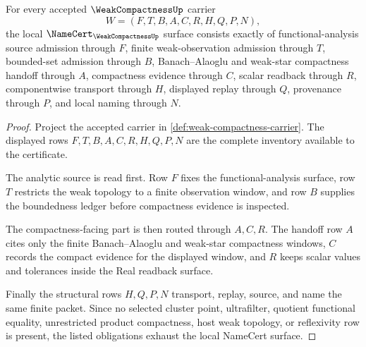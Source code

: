 \begin{theorem}
\label{thm:weak-compactness-namecert-obligations}
For every accepted $\WeakCompactnessUp$ carrier
$$
W=(F,T,B,A,C,R,H,Q,P,N),
$$
the local $\NameCert_{\WeakCompactnessUp}$ surface consists exactly of functional-analysis source admission through $F$, finite weak-observation admission through $T$, bounded-set admission through $B$, Banach--Alaoglu and weak-star compactness handoff through $A$, compactness evidence through $C$, scalar readback through $R$, componentwise transport through $H$, displayed replay through $Q$, provenance through $P$, and local naming through $N$.
\end{theorem}
\begin{proof}
Project the accepted carrier in \autoref{def:weak-compactness-carrier}. The displayed rows $F,T,B,A,C,R,H,Q,P,N$ are the complete inventory available to the certificate.

The analytic source is read first. Row $F$ fixes the functional-analysis surface, row $T$ restricts the weak topology to a finite observation window, and row $B$ supplies the boundedness ledger before compactness evidence is inspected.

The compactness-facing part is then routed through $A,C,R$. The handoff row $A$ cites only the finite Banach--Alaoglu and weak-star compactness windows, $C$ records the compact evidence for the displayed window, and $R$ keeps scalar values and tolerances inside the Real readback surface.

Finally the structural rows $H,Q,P,N$ transport, replay, source, and name the same finite packet. Since no selected cluster point, ultrafilter, quotient functional equality, unrestricted product compactness, host weak topology, or reflexivity row is present, the listed obligations exhaust the local NameCert surface.
\end{proof}

